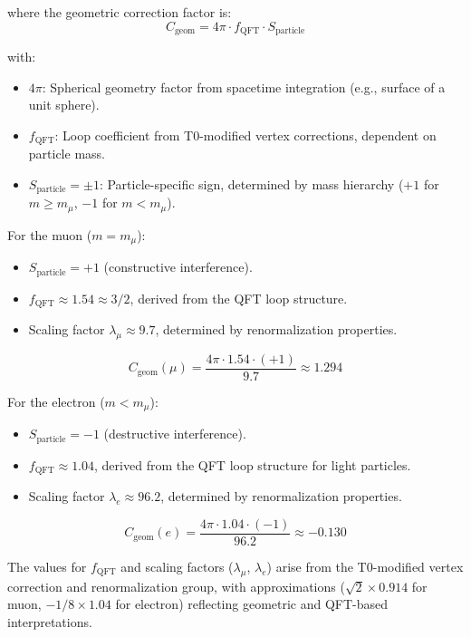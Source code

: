\documentclass[12pt,a4paper]{article}
\newcommand{\Cgeom}{C_{\text{geom}}}
\newcommand{\fQFT}{f_{\text{QFT}}}
\newcommand{\Sparticle}{S_{\text{particle}}}
\newcommand{\mmu}{m_{\mu}}
\begin{document}
	where the geometric correction factor is:
	\begin{equation}
		\Cgeom = 4\pi \cdot \fQFT \cdot \Sparticle
	\end{equation}
	
	with:
	\begin{itemize}
		\item \(4\pi\): Spherical geometry factor from spacetime integration (e.g., surface of a unit sphere).
		\item \(\fQFT\): Loop coefficient from T0-modified vertex corrections, dependent on particle mass.
		\item \(\Sparticle = \pm 1\): Particle-specific sign, determined by mass hierarchy (\(+1\) for \( m \geq \mmu \), \(-1\) for \( m < \mmu \)).
	\end{itemize}
	
	For the muon (\( m = \mmu \)):
	\begin{itemize}
		\item \(\Sparticle = +1\) (constructive interference).
		\item \(\fQFT \approx 1.54 \approx 3/2\), derived from the QFT loop structure.
		\item Scaling factor \(\lambda_\mu \approx 9.7\), determined by renormalization properties.
	\end{itemize}
	\begin{equation}
		\Cgeom(\mu) = \frac{4\pi \cdot 1.54 \cdot (+1)}{9.7} \approx 1.294
	\end{equation}
	
	For the electron (\( m < \mmu \)):
	\begin{itemize}
		\item \(\Sparticle = -1\) (destructive interference).
		\item \(\fQFT \approx 1.04\), derived from the QFT loop structure for light particles.
		\item Scaling factor \(\lambda_e \approx 96.2\), determined by renormalization properties.
	\end{itemize}
	\begin{equation}
		\Cgeom(e) = \frac{4\pi \cdot 1.04 \cdot (-1)}{96.2} \approx -0.130
	\end{equation}
	
	The values for \(\fQFT\) and scaling factors (\(\lambda_\mu\), \(\lambda_e\)) arise from the T0-modified vertex correction and renormalization group, with approximations (\(\sqrt{2} \times 0.914\) for muon, \(-1/8 \times 1.04\) for electron) reflecting geometric and QFT-based interpretations.
	
\end{document}
